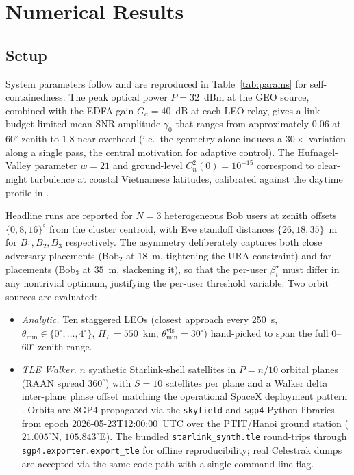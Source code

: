 \section{Numerical Results}\label{sec:results}

\subsection{Setup}\label{sec:results:setup}

System parameters follow \cite[Table~I]{vu2023photonics} and are reproduced in Table~\ref{tab:params} for self-containedness. The peak optical power $P{=}32$~dBm at the GEO source, combined with the EDFA gain $G_a{=}40$~dB at each LEO relay, gives a link-budget-limited mean SNR amplitude $\gamma_0$ that ranges from approximately $0.06$ at $60^\circ$ zenith to $1.8$ near overhead (i.e.~the geometry alone induces a $30\times$ variation along a single pass, the central motivation for adaptive control). The Hufnagel-Valley parameter $w{=}21$ and ground-level $C_n^2(0){=}10^{-15}$ correspond to clear-night turbulence at coastal Vietnamese latitudes, calibrated against the daytime profile in \cite{andrews2005laser}.

Headline runs are reported for $N{=}3$ heterogeneous Bob users at zenith offsets $\{0, 8, 16\}^\circ$ from the cluster centroid, with Eve standoff distances $\{26, 18, 35\}$~m for $B_1, B_2, B_3$ respectively. The asymmetry deliberately captures both close adversary placements (Bob$_2$ at $18$~m, tightening the URA constraint) and far placements (Bob$_3$ at $35$~m, slackening it), so that the per-user $\beta_i^\star$ must differ in any nontrivial optimum, justifying the per-user threshold variable. Two orbit sources are evaluated:
\begin{itemize}
\item \emph{Analytic.} Ten staggered LEOs (closest approach every 250~s, $\theta_{\min}\in\{0^\circ,\dots,4^\circ\}$, $H_L{=}550$~km, $\theta_{\min}^{\mathrm{vis}}{=}30^\circ$) hand-picked to span the full 0--60$^\circ$ zenith range.
\item \emph{TLE Walker.} $n$ synthetic Starlink-shell satellites in $P{=}n/10$ orbital planes (RAAN spread $360^\circ$) with $S{=}10$ satellites per plane and a Walker delta inter-plane phase offset matching the operational SpaceX deployment pattern \cite{del2019leosat,leyva2021inter}. Orbits are SGP4-propagated \cite{hoots1980sgp4,vallado2006sgp4} via the \texttt{skyfield} and \texttt{sgp4} Python libraries from epoch 2026-05-23T12:00:00~UTC over the PTIT/Hanoi ground station ($21.005^\circ$N, $105.843^\circ$E). The bundled \texttt{starlink\_synth.tle} round-trips through \texttt{sgp4.exporter.export\_tle} for offline reproducibility; real Celestrak \cite{celestrak} dumps are accepted via the same code path with a single command-line flag.
\end{itemize}

